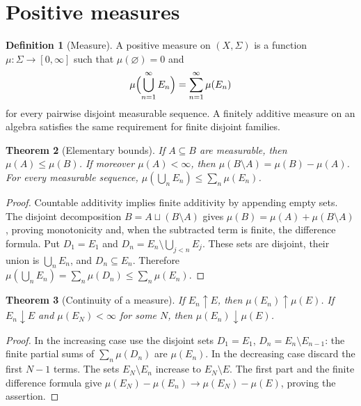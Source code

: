 \documentclass[11pt,oneside,openany]{book}
\newtheorem{theorem}{Theorem}[chapter]
\theoremstyle{definition}
\newtheorem{definition}[theorem]{Definition}
\theoremstyle{remark}
\newcommand{\Eplus}{[0,\infty]}
\newcommand{\family}[1]{}
\begin{document}
\section{Positive measures}

\begin{definition}[Measure]
\family{D11.01.positive_measure}\label{d11:01:positive-measure}
A positive measure on $(X,\Sigma)$ is a function
$\mu:\Sigma\to\Eplus$ such that $\mu(\varnothing)=0$ and
\[
 \mu\Bigl(\bigcup_{n=1}^{\infty}E_n\Bigr)=\sum_{n=1}^{\infty}\mu(E_n)
\]
for every pairwise disjoint measurable sequence. A finitely additive measure
on an algebra satisfies the same requirement for finite disjoint families.
\end{definition}

\begin{theorem}[Elementary bounds]
\family{D11.01.measure_bounds}\label{d11:01:measure-bounds}
If $A\subseteq B$ are measurable, then $\mu(A)\leq\mu(B)$. If moreover
$\mu(A)<\infty$, then $\mu(B\setminus A)=\mu(B)-\mu(A)$. For every
measurable sequence,
$\mu(\bigcup_n E_n)\leq\sum_n\mu(E_n)$.
\end{theorem}
\begin{proof}
Countable additivity implies finite additivity by appending empty sets.
The disjoint decomposition $B=A\sqcup(B\setminus A)$ gives
$\mu(B)=\mu(A)+\mu(B\setminus A)$, proving monotonicity and, when the
subtracted term is finite, the difference formula. Put
$D_1=E_1$ and $D_n=E_n\setminus\bigcup_{j<n}E_j$. These sets are disjoint,
their union is $\bigcup_nE_n$, and $D_n\subseteq E_n$. Therefore
$\mu(\bigcup_nE_n)=\sum_n\mu(D_n)\leq\sum_n\mu(E_n)$.
\end{proof}

\begin{theorem}[Continuity of a measure]
\family{D11.01.continuity_sets}\label{d11:01:continuity-sets}
If $E_n\uparrow E$, then $\mu(E_n)\uparrow\mu(E)$. If $E_n\downarrow E$
and $\mu(E_N)<\infty$ for some $N$, then $\mu(E_n)\downarrow\mu(E)$.
\end{theorem}
\begin{proof}
In the increasing case use the disjoint sets $D_1=E_1$,
$D_n=E_n\setminus E_{n-1}$: the finite partial sums of
$\sum_n\mu(D_n)$ are $\mu(E_n)$. In the decreasing case discard the first
$N-1$ terms. The sets $E_N\setminus E_n$ increase to $E_N\setminus E$.
The first part and the finite difference formula give
$\mu(E_N)-\mu(E_n)\to\mu(E_N)-\mu(E)$, proving the assertion.
\end{proof}
\end{document}

